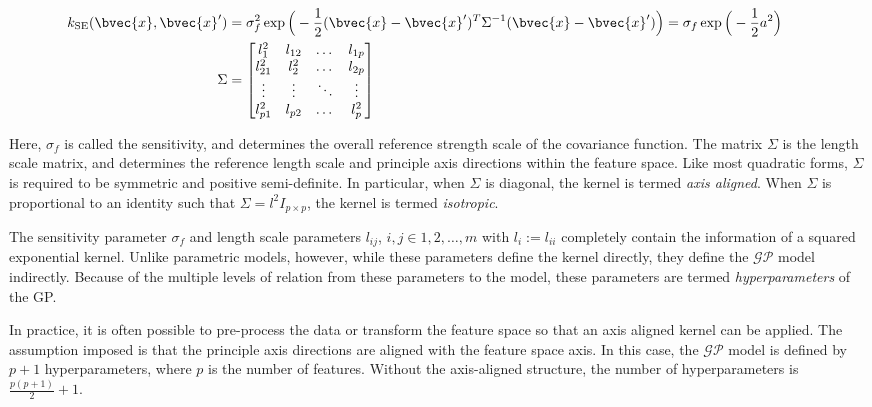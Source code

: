 				\begin{equation}
					\left.
						\begin{aligned}
							k_{\mathrm{SE}}(\bvec{x}, \bvec{x}') &= \sigma_{f}^{2} \exp\Big(-\frac{1}{2}(\bvec{x} - \bvec{x}')^{T} \Sigma^{-1} (\bvec{x} - \bvec{x}')\Big) = \sigma_{f} \exp\Big(-\frac{1}{2} a^{2} \Big) \\
							\Sigma &= 	\begin{bmatrix}
											l_{1}^{2} & l_{12} & \dots & l_{1p} \\
											l_{21}^{2} & l_{2}^{2} & \dots & l_{2p} \\
											\vdots & \vdots  & \ddots & \vdots \\
											l_{p1}^{2} & l_{p2} & \dots & l_{p}^{2} \\
									  	\end{bmatrix}
						\end{aligned}
					\qquad \right.
				\label{Equation:SquaredExponentialKernel}
				\end{equation}
				
				Here, $\sigma_{f}$ is called the sensitivity, and determines the overall reference strength scale of the covariance function. The matrix $\Sigma$ is the length scale matrix, and determines the reference length scale and principle axis directions within the feature space. Like most quadratic forms, $\Sigma$ is required to be symmetric and positive semi-definite. In particular, when $\Sigma$ is diagonal, the kernel is termed \textit{axis aligned}. When $\Sigma$ is proportional to an identity such that $\Sigma = l^{2} I_{p \times p}$, the kernel is termed \textit{isotropic}.
				
				The sensitivity parameter $\sigma_{f}$ and length scale parameters $l_{ij}$, $i, j \in {1, 2, \dots, m}$ with $l_{i} := l_{ii}$ completely contain the information of a squared exponential kernel. Unlike parametric models, however, while these parameters define the kernel directly, they define the $\mathcal{GP}$ model indirectly. Because of the multiple levels of relation from these parameters to the model, these parameters are termed \textit{hyperparameters} of the GP.
				
				In practice, it is often possible to pre-process the data or transform the feature space so that an axis aligned kernel can be applied. The assumption imposed is that the principle axis directions are aligned with the feature space axis. In this case, the $\mathcal{GP}$ model is defined by $p + 1$ hyperparameters, where $p$ is the number of features. Without the axis-aligned structure, the number of hyperparameters is $\frac{p(p + 1)}{2} + 1$.
				
